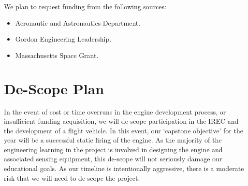 \documentclass{article}
\begin{document}
We plan to request funding from the following sources:
\begin{itemize}
\item Aeronautic and Astronautics Department.
\item Gordon Engineering Leadership.
\item Massachusetts Space Grant.
\end{itemize}

\section*{De-Scope Plan}
In the event of cost or time overruns in the engine development process, or insufficient funding acquisition, we will de-scope participation in the IREC and the development of a flight vehicle. In this event, our `capstone objective' for the year will be a successful static firing of the engine. As the majority of the engineering learning in the project is involved in designing the engine and associated sensing equipment, this de-scope will not seriously damage our educational goals. As our timeline is intentionally aggressive, there is a moderate risk that we will need to de-scope the project.
\end{document}
